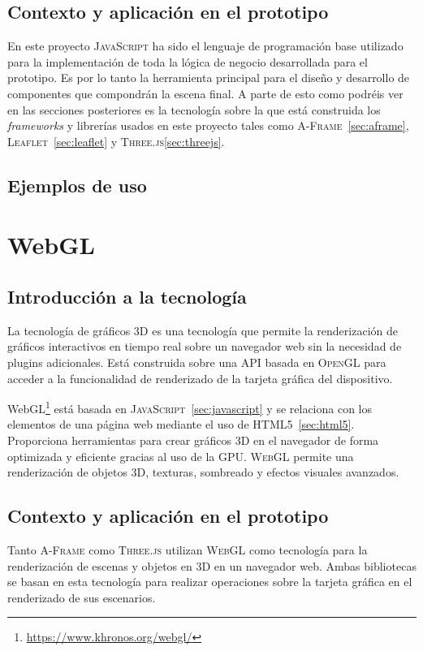 \documentclass[a4paper, 11pt]{book}
\begin{document}
\subsection{Contexto y aplicación en el prototipo}
En este proyecto \textsc{JavaScript} ha sido el lenguaje de programación base utilizado para la implementación de toda la lógica de negocio desarrollada para el prototipo. Es por lo tanto la herramienta principal para el diseño y desarrollo de componentes que compondrán la escena final. A parte de esto como podréis ver en las secciones posteriores es la tecnología sobre la que está construida los \emph{\gls{framework}s} y librerías usados en este proyecto tales como \textsc{A-Frame}~\ref{sec:aframe}, \textsc{Leaflet}~\ref{sec:leaflet} y \textsc{Three.js}\ref{sec:threejs}.
\subsection{Ejemplos de uso}

\section{WebGL}
\label{sec:webgl}
\subsection{Introducción a la tecnología}
La tecnología de gráficos \textsc{\gls{3D}} es una tecnología que permite la \gls{renderización} de gráficos interactivos en tiempo real sobre un navegador web sin la necesidad de plugins adicionales. Está construida sobre una \textsc{\gls{API}} basada en \textsc{\gls{OpenGL}} para acceder a la funcionalidad de renderizado de la tarjeta gráfica del dispositivo.

WebGL\footnote{\url{https://www.khronos.org/webgl/}} está basada en \textsc{JavaScript}~\ref{sec:javascript} y se relaciona con los elementos de una página web mediante el uso de \textsc{HTML5}~\ref{sec:html5}. 
Proporciona herramientas para crear gráficos \textsc{3D} en el navegador de forma optimizada y eficiente gracias al uso de la \gls{GPU}. \textsc{WebGL} permite una renderización de objetos 3D, texturas, sombreado y efectos visuales avanzados.
\subsection{Contexto y aplicación en el prototipo}
Tanto \textsc{A-Frame} como \textsc{Three.js} utilizan \textsc{WebGL} como tecnología para la renderización de escenas y objetos en \textsc{3D} en un navegador web. Ambas bibliotecas se basan en esta tecnología para realizar operaciones sobre la tarjeta gráfica en el renderizado de sus escenarios.
\end{document}
